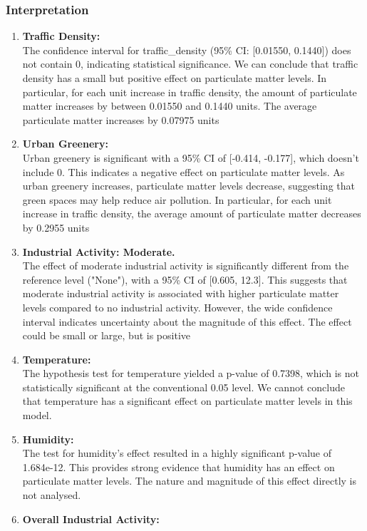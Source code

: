 \documentclass{article}
\begin{document}
\subsubsection*{Interpretation}
\begin{enumerate}
    \item \textbf{Traffic Density:} \\
    The confidence interval for traffic\_density (95\% CI: [0.01550, 0.1440]) does not contain 0, indicating statistical significance. We can conclude that traffic density has a small but positive effect on particulate matter levels. In particular, for each unit increase in traffic density, the amount of particulate matter increases by between 0.01550 and 0.1440 units. The average particulate matter increases by 0.07975 units
    \item \textbf{Urban Greenery:} \\
    Urban greenery is significant with a 95\% CI of [-0.414, -0.177], which doesn't include 0. This indicates a negative effect on particulate matter levels. As urban greenery increases, particulate matter levels decrease, suggesting that green spaces may help reduce air pollution. In particular, for each unit increase in traffic density, the average amount of particulate matter decreases by 0.2955 units
    \item \textbf{Industrial Activity: Moderate.} \\
    The effect of moderate industrial activity is significantly different from the reference level ("None"), with a 95\% CI of [0.605, 12.3]. This suggests that moderate industrial activity is associated with higher particulate matter levels compared to no industrial activity. However, the wide confidence interval indicates uncertainty about the magnitude of this effect. The effect could be small or large, but is positive
    \item \textbf{Temperature:} \\ The hypothesis test for temperature yielded a p-value of 0.7398, which is not statistically significant at the conventional 0.05 level. We cannot conclude that temperature has a significant effect on particulate matter levels in this model.
    \item \textbf{Humidity:} \\ The test for humidity's effect resulted in a highly significant p-value of 1.684e-12. This provides strong evidence that humidity has an effect on particulate matter levels. The nature and magnitude of this effect directly is not analysed.
    \item \textbf{Overall Industrial Activity:} \\

\end{enumerate}
\end{document}
